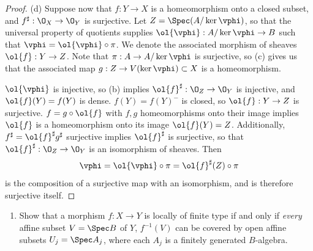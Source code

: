\documentclass[12pt]{amsart}
\begin{document}
\begin{proof}
  (d) Suppose now that $f:Y\to X$ is a homeomorphism onto a closed subset, and $f^\sharp:\O_X\to\O_Y$ is surjective.
  Let $Z=\Spec(A/\ker \vphi)$, so that the universal property of quotients supplies $\ol{\vphi}:A/\ker\vphi\to B$ such that $\vphi = \ol{\vphi}\circ \pi$.
  We denote the associated morphism of sheaves $\ol{f}:Y\to Z$.
  Note that $\pi:A\to A/\ker\vphi$ is surjective, so (c) gives us that the associated map $g:Z\to V(\ker\vphi)\subset X$ is a homeomorphism.

  $\ol{\vphi}$ is injective, so (b) implies $\ol{f}^\sharp:\O_Z\to \O_Y$ is injective, and $\ol{f}(Y)=f(Y)$ is dense.
  $f(Y)=f(Y)^-$ is closed, so $\ol{f}:Y\to Z$ is surjective.
  $f = g\circ \ol{f}$ with $f,g$ homeomorphisms onto their image implies $\ol{f}$ is a homeomorphism onto its image $\ol{f}(Y)=Z$.
  Additionally, $f^\sharp = \ol{f}^\sharp g^\sharp$ surjective implies $\ol{f}^\sharp$ is surjective, so that $\ol{f}^\sharp:\O_Z\to \O_Y$ is an isomorphism of sheaves.
  Then 
  \[
    \vphi =\ol{\vphi}\circ \pi = \ol{f}^\sharp(Z)\circ \pi
  \]
  is the composition of a surjective map with an isomorphism, and is therefore surjective itself.
\end{proof}

\begin{enumerate}
	\item[3.1.] {
      Show that a morphism $f:X\to Y$ is locally of finite type if and only if \emph{every} affine subset $V=\Spec B$ of $Y$, $f^{-1}(V)$ can be covered by open affine subsets $U_j=\Spec A_j$, where each $A_j$ is a finitely generated $B$-algebra.
    }
\end{enumerate}
\end{document}
